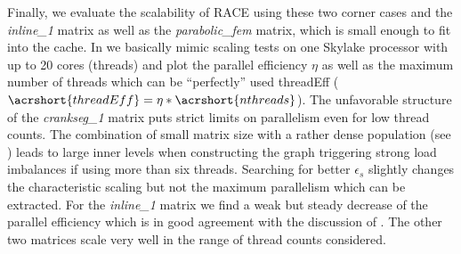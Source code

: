 Finally, we evaluate the scalability of RACE using these two corner cases and the \emph{inline\_1} matrix as well as the \emph{parabolic\_fem} matrix, which is small enough to fit into the cache. 
In  we basically mimic scaling tests on one Skylake processor with up to 20 cores (\ie threads) and plot the parallel efficiency $\eta$ as well as the maximum number of threads which can be ``perfectly'' used \acrshort{threadEff} (\ie $\acrshort{threadEff} = \eta*\acrshort{nthreads}$). 
The unfavorable structure of the \emph{crankseg\_1} matrix puts strict limits on parallelism even for low thread counts.  The combination of small matrix size with a rather dense population (see ) leads to large inner levels when constructing the graph triggering strong load imbalances if using more than six threads. Searching for better $\epsilon_s$ slightly changes the characteristic scaling but not the maximum parallelism which can be extracted. For the \emph{inline\_1} matrix we find a weak but steady decrease of the parallel efficiency which is in good agreement with the discussion of . The other two matrices scale very well in the range of thread counts considered. 


